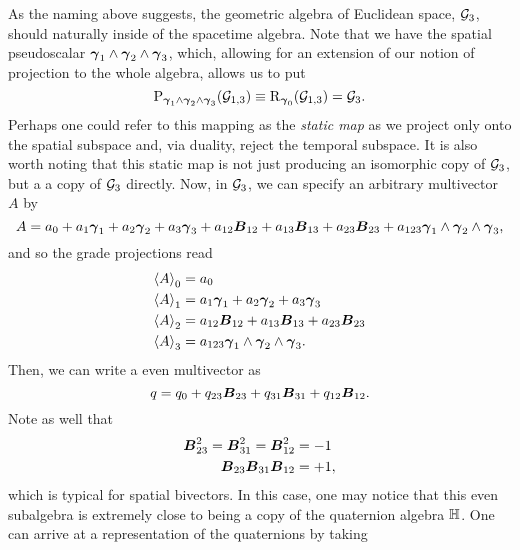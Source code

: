 As the naming above suggests, the geometric algebra of Euclidean space, $\G_3$, should naturally inside of the spacetime algebra. Note that we have the spatial pseudoscalar $\blade{\gamma}_1 \wedge \blade{\gamma}_2 \wedge \blade{\gamma}_3$, which, allowing for an extension of our notion of projection to the whole algebra, allows us to put
\begin{equation}
\projection_{\blade{\gamma}_1 \wedge \blade{\gamma}_2 \wedge \blade{\gamma}_3}(\G_{1,3}) \equiv \rejection_{\blade{\gamma}_0} (\G_{1,3}) = \G_3.
\end{equation}
Perhaps one could refer to this mapping as the \emph{static map} as we project only onto the spatial subspace and, via duality, reject the temporal subspace. It is also worth noting that this static map is not just producing an isomorphic copy of $\G_3$, but a a copy of $\G_3$ directly. Now, in $\G_3$, we can specify an arbitrary multivector $A$ by
\begin{equation}
A= a_0 + a_1 \blade{\gamma}_1 + a_2 \blade{\gamma}_2 + a_3 \blade{\gamma}_3 + a_{12} \blade{B}_{12} + a_{13} \blade{B}_{13} + a_{23} \blade{B}_{23} + a_{123} \blade{\gamma}_1 \wedge \blade{\gamma}_2 \wedge \blade{\gamma}_3,
\end{equation}
and so the grade projections read
\begin{subequations}
\begin{align}
\proj{0}{A}&=a_0\\
\proj{1}{A}&=a_1 \blade{\gamma}_1 + a_2 \blade{\gamma}_2 + a_3 \blade{\gamma}_3\\
\proj{2}{A}&=a_{12} \blade{B}_{12} + a_{13} \blade{B}_{13} + a_{23} \blade{B}_{23}\\
\proj{3}{A}&= a_{123} \blade{\gamma}_1 \wedge \blade{\gamma}_2 \wedge \blade{\gamma}_3.
\end{align}
\end{subequations}
Then, we can write a even multivector as
\begin{equation}
q = q_0 + q_{23}\blade{B}_{23} + q_{31} \blade{B}_{31} + q_{12} \blade{B}_{12}.
\end{equation}
Note as well that
\begin{subequations}
\begin{align}
\blade{B}_{23}^2 = \blade{B}_{31}^2 = \blade{B}_{12}^2 &= -1\\
\blade{B}_{23}\blade{B}_{31}\blade{B}_{12} &= +1,
\end{align}
\end{subequations}
which is typical for spatial bivectors. In this case, one may notice that this even subalgebra is extremely close to being a copy of the quaternion algebra $\quat$. One can arrive at a representation of the quaternions by taking
